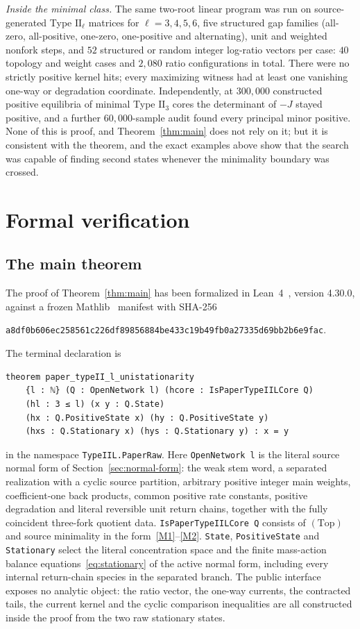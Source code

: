\documentclass[11pt,reqno]{amsart}
\theoremstyle{plain}
\theoremstyle{definition}
\theoremstyle{remark}
\numberwithin{equation}{section}
\newcommand{\Top}{\mathrm{(Top)}}
\begin{document}
\emph{Inside the minimal class.}  The same two-root linear program was run on source-generated Type $\mathrm{II}_\ell$ matrices for $\ell=3,4,5,6$, five structured gap families (all-zero, all-positive, one-zero, one-positive and alternating), unit and weighted nonfork steps, and $52$ structured or random integer log-ratio vectors per case: $40$ topology and weight cases and $2{,}080$ ratio configurations in total.  There were no strictly positive kernel hits; every maximizing witness had at least one vanishing one-way or degradation coordinate.  Independently, at $300{,}000$ constructed positive equilibria of minimal Type $\mathrm{II}_3$ cores the determinant of $-J$ stayed positive, and a further $60{,}000$-sample audit found every principal minor positive.  None of this is proof, and Theorem~\ref{thm:main} does not rely on it; but it is consistent with the theorem, and the exact examples above show that the search was capable of finding second states whenever the minimality boundary was crossed.

\section{Formal verification}\label{sec:formal}

\subsection{The main theorem}
The proof of Theorem~\ref{thm:main} has been formalized in Lean~4~\cite{dMU21}, version 4.30.0, against a frozen Mathlib~\cite{mathlib20} manifest with SHA-256
\begin{center}\small\texttt{a8df0b606ec258561c226df89856884be433c19b49fb0a27335d69bb2b6e9fac}.\end{center}
The terminal declaration is
\begin{lstlisting}
theorem paper_typeII_l_unistationarity
    {l : ℕ} (Q : OpenNetwork l) (hcore : IsPaperTypeIILCore Q)
    (hl : 3 ≤ l) (x y : Q.State)
    (hx : Q.PositiveState x) (hy : Q.PositiveState y)
    (hxs : Q.Stationary x) (hys : Q.Stationary y) : x = y
\end{lstlisting}
in the namespace \texttt{TypeIIL.PaperRaw}.  Here \texttt{OpenNetwork l} is the literal source normal form of Section~\ref{sec:normal-form}: the weak stem word, a separated realization with a cyclic source partition, arbitrary positive integer main weights, coefficient-one back products, common positive rate constants, positive degradation and literal reversible unit return chains, together with the fully coincident three-fork quotient data.  \texttt{IsPaperTypeIILCore Q} consists of $\Top$ and source minimality in the form~\ref{M1}--\ref{M2}.  \texttt{State}, \texttt{PositiveState} and \texttt{Stationary} select the literal concentration space and the finite mass-action balance equations~\eqref{eq:stationary} of the active normal form, including every internal return-chain species in the separated branch.  The public interface exposes no analytic object: the ratio vector, the one-way currents, the contracted tails, the current kernel and the cyclic comparison inequalities are all constructed inside the proof from the two raw stationary states.
\end{document}
